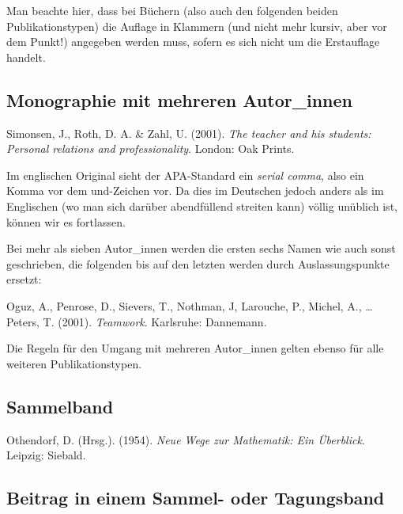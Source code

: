 \documentclass[
  bibliography=totoc,
  oneside,
  12pt,
  a4paper]{scrbook}
\begin{document}
Man beachte hier, dass bei Büchern (also auch den folgenden beiden
Publikationstypen) die Auflage in Klammern (und nicht mehr kursiv, aber
vor dem Punkt!) angegeben werden muss, sofern es sich nicht um die
Erstauflage handelt.

\hypertarget{monographie-mit-mehreren-autor_innen}{%
\subsection*{Monographie mit mehreren Autor\_innen}\label{monographie-mit-mehreren-autor_innen}}

Simonsen, J., Roth, D. A. \& Zahl, U. (2001). \emph{The teacher and his
students: Personal relations and professionality}. London: Oak Prints.

Im englischen Original sieht der APA-Standard ein \emph{serial comma}, also
ein Komma vor dem und-Zeichen vor. Da dies im Deutschen jedoch anders
als im Englischen (wo man sich darüber abendfüllend streiten kann)
völlig unüblich ist, können wir es fortlassen.

Bei mehr als sieben Autor\_innen werden die ersten sechs Namen wie auch sonst geschrieben, die folgenden bis auf den letzten werden durch Auslassungspunkte ersetzt:

Oguz, A., Penrose, D., Sievers, T., Nothman, J, Larouche, P., Michel, A., \ldots{} Peters, T. (2001). \emph{Teamwork}. Karlsruhe: Dannemann.

Die Regeln für den Umgang mit mehreren Autor\_innen gelten ebenso für alle weiteren Publikationstypen.

\hypertarget{sammelband}{%
\subsection*{Sammelband}\label{sammelband}}

Othendorf, D. (Hrsg.). (1954). \emph{Neue Wege zur Mathematik: Ein Überblick}. Leipzig: Siebald.

\hypertarget{beitrag-in-einem-sammel--oder-tagungsband}{%
\subsection*{Beitrag in einem Sammel- oder Tagungsband}\label{beitrag-in-einem-sammel--oder-tagungsband}}
\end{document}
